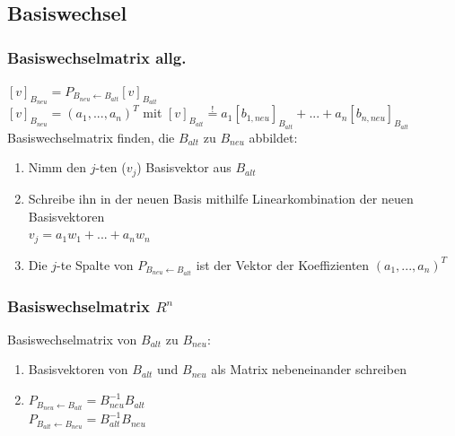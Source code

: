 \documentclass[german, fourcolumn, 8pt]{latex4ei/latex4ei_sheet}
\begin{document}
\subsection{Basiswechsel}
\begin{sectionbox}
    \subsubsection{Basiswechselmatrix allg.}
    $[v]_{B_{neu}}=P_{B_{neu} \leftarrow B_{alt}}[v]_{B_{alt}}$\\
    $[v]_{B_{neu}}=(a_1,...,a_n)^T$ mit $[v]_{B_{alt}}\overset{!}{=}a_1[b_{1,neu}]_{B_{alt}} + ... + a_n[b_{n,neu}]_{B_{alt}}$\\
    Basiswechselmatrix finden, die $B_{alt}$ zu $B_{neu}$ abbildet:
    \begin{enumerate}
        \item Nimm den $j$-ten ($v_j$) Basisvektor aus $B_{alt}$
        \item Schreibe ihn in der neuen Basis mithilfe Linearkombination der neuen Basisvektoren\\
              $v_j=a_1w_1+...+a_nw_n$
        \item Die $j$-te Spalte von $P_{B_{neu} \leftarrow B_{alt}}$ ist der Vektor der Koeffizienten $(a_1, ..., a_n)^T$
    \end{enumerate}
\end{sectionbox}

\begin{sectionbox}
    \subsubsection{Basiswechselmatrix $R^n$}
    Basiswechselmatrix von $B_{alt}$ zu $B_{neu}$:
    \begin{enumerate}
        \item Basisvektoren von $B_{alt}$ und $B_{neu}$ als Matrix nebeneinander schreiben
        \item $P_{B_{neu} \leftarrow B_{alt}}=B_{neu}^{-1}B_{alt}$\\
              $P_{B_{alt} \leftarrow B_{neu}}=B_{alt}^{-1}B_{neu}$
    \end{enumerate}
\end{sectionbox}
\end{document}
